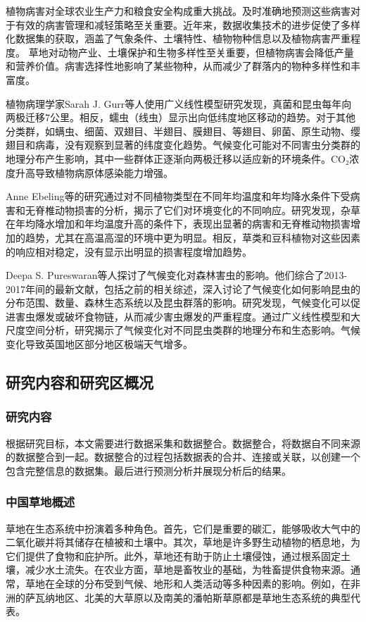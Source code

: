 \documentclass{article}
\begin{document}
	植物病害对全球农业生产力和粮食安全构成重大挑战。及时准确地预测这些病害对于有效的病害管理和减轻策略至关重要。近年来，数据收集技术的进步促使了多样化数据集的获取，涵盖了气象条件、土壤特性、植物物种信息以及植物病害严重程度。
草地对动物产业、土壤保护和生物多样性至关重要，但植物病害会降低产量和营养价值\cite{Chakraborty2018}。病害选择性地影响了某些物种，从而减少了群落内的物种多样性和丰富度\cite{Grunberg2023}。

植物病理学家Sarah J. Gurr等人使用广义线性模型研究发现，真菌和昆虫每年向两极迁移7公里。相反，蠕虫（线虫）显示出向低纬度地区移动的趋势。对于其他分类群，如螨虫、细菌、双翅目、半翅目、膜翅目、等翅目、卵菌、原生动物、缨翅目和病毒，没有观察到显著的纬度变化趋势。气候变化可能对不同害虫分类群的地理分布产生影响，其中一些群体正逐渐向两极迁移以适应新的环境条件。CO₂浓度升高导致植物病原体感染能力增强\cite{Sukumar2018}。

Anne Ebeling等的研究通过对不同植物类型在不同年均温度和年均降水条件下受病害和无脊椎动物损害的分析，揭示了它们对环境变化的不同响应。研究发现，杂草在年均降水增加和年均温度升高的条件下，表现出显著的病害和无脊椎动物损害增加的趋势，尤其在高温高湿的环境中更为明显。相反，草类和豆科植物对这些因素的响应相对稳定，没有显示出明显的损害程度增加趋势\cite{Ebeling2023}。

Deepa S. Pureswaran等人探讨了气候变化对森林害虫的影响。他们综合了2013-2017年间的最新文献，包括之前的相关综述，深入讨论了气候变化如何影响昆虫的分布范围、数量、森林生态系统以及昆虫群落的影响。研究发现，气候变化可以促进害虫爆发或破坏食物链，从而减少害虫爆发的严重程度。通过广义线性模型和大尺度空间分析，研究揭示了气候变化对不同昆虫类群的地理分布和生态影响。气候变化导致英国地区部分地区极端天气增多\cite{Angelotti2024}。

	\subsection{研究内容和研究区概况}
	
	\subsubsection{研究内容}
	
	根据研究目标，本文需要进行数据采集和数据整合。数据整合，将数据自不同来源的数据整合到一起。数据整合的过程包括数据表的合并、连接或关联，以创建一个包含完整信息的数据集。最后进行预测分析并展现分析后的结果。
	
	\subsubsection{中国草地概述}
	草地在生态系统中扮演着多种角色。首先，它们是重要的碳汇，能够吸收大气中的二氧化碳并将其储存在植被和土壤中。其次，草地是许多野生动植物的栖息地，为它们提供了食物和庇护所。此外，草地还有助于防止土壤侵蚀，通过根系固定土壤，减少水土流失。在农业方面，草地是畜牧业的基础，为牲畜提供食物来源。通常，草地在全球的分布受到气候、地形和人类活动等多种因素的影响。例如，在非洲的萨瓦纳地区、北美的大草原以及南美的潘帕斯草原都是草地生态系统的典型代表。
	
\end{document}
